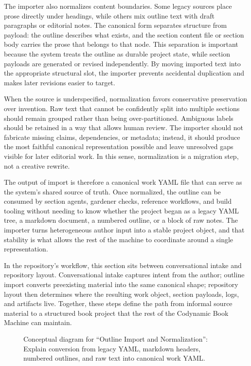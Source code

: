 \documentclass[11pt]{article}
\begin{document}
The importer also normalizes content boundaries. Some legacy sources place prose directly under headings, while others mix outline text with draft paragraphs or editorial notes. The canonical form separates structure from payload: the outline describes what exists, and the section content file or section body carries the prose that belongs to that node. This separation is important because the system treats the outline as durable project state, while section payloads are generated or revised independently. By moving imported text into the appropriate structural slot, the importer prevents accidental duplication and makes later revisions easier to target.

When the source is underspecified, normalization favors conservative preservation over invention. Raw text that cannot be confidently split into multiple sections should remain grouped rather than being over-partitioned. Ambiguous labels should be retained in a way that allows human review. The importer should not fabricate missing claims, dependencies, or metadata; instead, it should produce the most faithful canonical representation possible and leave unresolved gaps visible for later editorial work. In this sense, normalization is a migration step, not a creative rewrite.

The output of import is therefore a canonical work YAML file that can serve as the system's shared source of truth. Once normalized, the outline can be consumed by section agents, gardener checks, reference workflows, and build tooling without needing to know whether the project began as a legacy YAML tree, a markdown document, a numbered outline, or a block of raw notes. The importer turns heterogeneous author input into a stable project object, and that stability is what allows the rest of the machine to coordinate around a single representation.

In the repository's workflow, this section sits between conversational intake and repository layout. Conversational intake captures intent from the author; outline import converts preexisting material into the same canonical shape; repository layout then determines where the resulting work object, section payloads, logs, and artifacts live. Together, these steps define the path from informal source material to a structured book project that the rest of the Codynamic Book Machine can maintain.

\begin{figure}[htbp]
\centering

\caption{Conceptual diagram for ``Outline Import and Normalization'': Explain conversion from legacy YAML, markdown headers, numbered outlines, and raw text into canonical work YAML.}
\end{figure}
\end{document}
